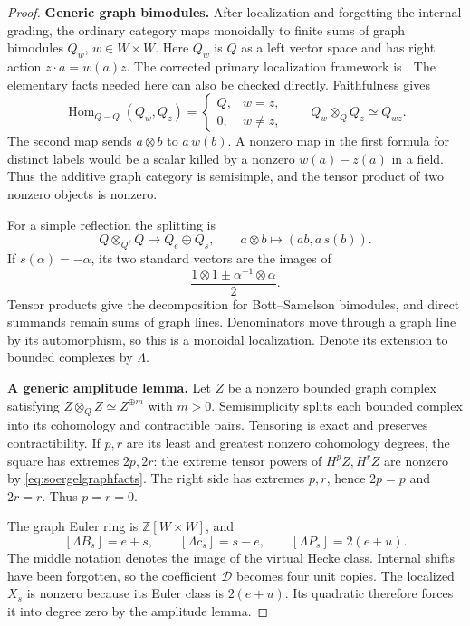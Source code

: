 \documentclass[11pt,a4paper]{article}
\newcommand{\mathscr}{\mathcal}
\renewcommand{\S}{\ensuremath{\mathsection}}
\theoremstyle{named}\newtheorem{finding}{Finding}[section]
\theoremstyle{definition}\newtheorem{definition}[finding]{Definition}
\theoremstyle{remark}\newtheorem{remark}[finding]{Remark}
\begin{document}
\begin{proof}
\par\smallskip\noindent\textbf{Generic graph bimodules.}\quad
After localization and forgetting the internal grading, the
ordinary category maps monoidally to finite sums of graph
bimodules \(Q_w\), \(w\in W\times W\). Here \(Q_w\)
is \(Q\) as a left vector space and has right action
\(z\cdot a=w(a)z\). The corrected primary localization
framework is \cite[\S1.1, pp.~3--4; \S1.2,
Theorem~1.6 and Remark~1.7, pp.~4--5;
\S2.1, equations~(2.1)--(2.6), p.~7]{EWLocalized}.
The elementary facts needed here can also be checked directly.
Faithfulness gives
\begin{equation}\label{eq:soergelgraphfacts}
 \operatorname{Hom}_{Q-Q}(Q_w,Q_z)=
 \begin{cases}Q,&w=z,\\0,&w\ne z,\end{cases}
 \qquad Q_w\otimes_Q Q_z\simeq Q_{wz}.
\end{equation}
The second map sends \(a\otimes b\) to \(a\,w(b)\).
A nonzero map in the first formula for distinct labels would
be a scalar killed by a nonzero \(w(a)-z(a)\) in a field.
Thus the additive graph category is semisimple, and the
tensor product of two nonzero objects is nonzero.

For a simple reflection the splitting is
\[
 Q\otimes_{Q^s}Q\longrightarrow Q_e\oplus Q_s,
 \qquad a\otimes b\longmapsto(ab,a\,s(b)).
\]
If \(s(\alpha)=-\alpha\), its two standard vectors are
the images of
\[
       \frac{1\otimes1\pm\alpha^{-1}\otimes\alpha}{2}.
\]
Tensor products give the decomposition for Bott--Samelson
bimodules, and direct summands remain sums of graph lines.
Denominators move through a graph line by its automorphism,
so this is a monoidal localization. Denote its extension
to bounded complexes by \(\Lambda\).

\par\smallskip\noindent\textbf{A generic amplitude lemma.}\quad
Let \(Z\) be a nonzero bounded graph complex satisfying
\(Z\otimes_Q Z\simeq Z^{\oplus m}\) with \(m>0\).
Semisimplicity splits each bounded complex into its
cohomology and contractible pairs. Tensoring is exact and
preserves contractibility. If \(p,r\) are its least and
greatest nonzero cohomology degrees, the square has
extremes \(2p,2r\): the extreme tensor powers of
\(H^pZ,H^rZ\) are nonzero by
\eqref{eq:soergelgraphfacts}. The right side has extremes
\(p,r\), hence \(2p=p\) and \(2r=r\). Thus \(p=r=0\).

The graph Euler ring is \(\mathbb Z[W\times W]\), and
\[
 [\Lambda B_s]=e+s,\qquad
 [\Lambda c_s]=s-e,\qquad
 [\Lambda P_s]=2(e+u).
\]
The middle notation denotes the image of the virtual
Hecke class. Internal shifts have been forgotten, so the
coefficient \(\mathscr D\) becomes four unit copies.
The localized \(X_s\) is nonzero because its Euler class
is \(2(e+u)\). Its quadratic therefore forces it into
degree zero by the amplitude lemma.


\end{proof}
\end{document}
